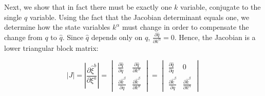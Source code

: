 \documentclass[letterpaper]{article}
\begin{document}

Next, we show that in fact there must be exactly one $k$ variable, conjugate to the single $q$ variable. Using the fact that the Jacobian determinant equals one, we determine how the state variables $k^\alpha$ must change in order to compensate the change from $q$ to $\hat q$. Since $\hat{q}$ depends only on $q$, $\frac{\partial \hat{q}}{\partial k^\alpha} = 0$. Hence, the Jacobian is a lower triangular block matrix: 



\begin{equation}
|J| = \left|\frac{\partial \hat{\xi}^b}{\partial \xi^a} \right| = \begin{vmatrix}
\frac{\partial \hat{q}}{\partial q} & \frac{\partial \hat{q}}{\partial k^\alpha} \\
\frac{\partial \hat{k}^\beta}{\partial q} & \frac{\partial \hat{k}^\beta}{\partial  k^\alpha} 
\end{vmatrix} = \begin{vmatrix}
\frac{\partial \hat{q}}{\partial q} & 0 \\
\frac{\partial \hat{k}^\beta}{\partial q} & \frac{\partial \hat{k}^\beta}{\partial  k^\alpha}
\end{vmatrix}
\end{equation}
\end{document}
